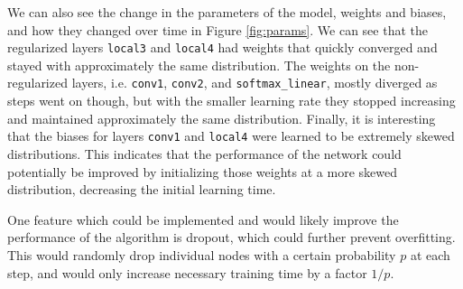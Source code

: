 \documentclass[10pt, twocolumn, twoside]{article}
\begin{document}
We can also see the change in the parameters of the model, weights and biases, and how they changed over time in Figure \ref{fig:params}. We can see that the regularized layers \texttt{local3} and \texttt{local4} had weights that quickly converged and stayed with approximately the same distribution. The weights on the non-regularized layers, i.e. \texttt{conv1}, \texttt{conv2}, and \texttt{softmax\_linear}, mostly diverged as steps went on though, but with the smaller learning rate they stopped increasing and maintained approximately the same distribution. Finally, it is interesting that the biases for layers \texttt{conv1} and \texttt{local4} were learned to be extremely skewed distributions. This indicates that the performance of the network could potentially be improved by initializing those weights at a more skewed distribution, decreasing the initial learning time.

One feature which could be implemented and would likely improve the performance of the algorithm is dropout, which could further prevent overfitting. This would randomly drop individual nodes with a certain probability $p$ at each step, and would only increase necessary training time by a factor $1/p$.
\end{document}
